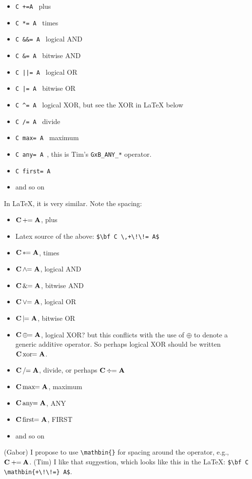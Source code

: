 \documentclass[11pt]{article}
\begin{document}
    \begin{itemize}
    \item[] \verb'C +=A ' plus
    \item[] \verb'C *= A ' times
    \item[] \verb'C &&= A ' logical AND
    \item[] \verb'C &= A ' bitwise AND
    \item[] \verb'C ||= A ' logical OR
    \item[] \verb'C |= A ' bitwise OR
    \item[] \verb'C ^= A ' logical XOR, but see the XOR in LaTeX below
    \item[] \verb'C /= A ' divide
    \item[] \verb'C max= A ' maximum
    \item[] \verb'C any= A ', this is Tim's \verb'GxB_ANY_*' operator.
    \item[] \verb'C first= A '
    \item[] and so on
    \end{itemize}

In LaTeX, it is very similar.  Note the spacing:

    \begin{itemize}
    \item[] $\bf C \,+\!\!= A $, plus
    \item[] Latex source of the above: \verb'$\bf C \,+\!\!= A$'
    \item[] $\bf C \,*\!\!= A $, times
    \item[] $\bf C \,\wedge\!\!= A $, logical AND
    \item[] $\bf C \,\&\!\!= A $, bitwise AND
    \item[] $\bf C \,\vee\!\!= A $, logical OR
    \item[] $\bf C \,|\!\!= A $, bitwise OR
    \item[] $\bf C \,\oplus\!\!= A $, logical XOR?  but this conflicts with
        the use of $\oplus$ to denote a generic additive operator.
        So perhaps logical XOR should be written
        $\bf C \,\mbox{xor}\!\!= A $.
    \item[] $\bf C \,/\!\!= A $, divide, or perhaps
        $\bf C \,\div\!\!= A $
    \item[] $\bf C \,\mbox{max}\!\!= A $, maximum
    \item[] $\bf C \,\mbox{any}\!\!= A $, ANY
    \item[] $\bf C \,\mbox{first}\!\!= A $, FIRST
    \item[] and so on
    \end{itemize}

(Gabor) I propose to use \verb+\mathbin{}+ for spacing around the operator,
e.g., $\bf C \mathbin{+\!\!=} A $.
(Tim) I like that suggestion, which looks like this in the LaTeX:
\verb'$\bf C \mathbin{+\!\!=} A$'.
\end{document}
